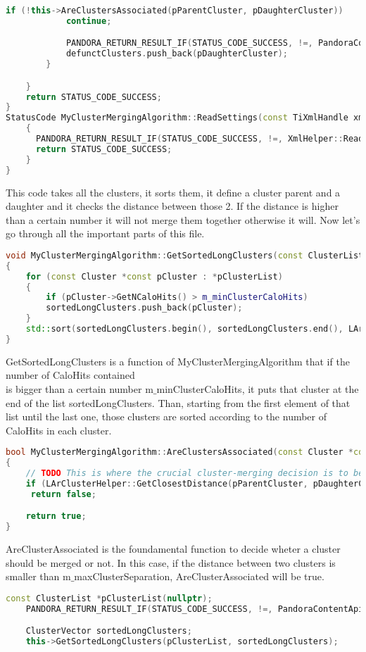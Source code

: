 \begin{lstlisting}[language=C++,caption=MyClusterMergingAlgorithm.cc]
			if (!this->AreClustersAssociated(pParentCluster, pDaughterCluster))
			continue;

			PANDORA_RETURN_RESULT_IF(STATUS_CODE_SUCCESS, !=, PandoraContentApi::MergeAndDeleteClusters(*this, pParentCluster, pDaughterCluster));
			defunctClusters.push_back(pDaughterCluster);
		}

	}
	return STATUS_CODE_SUCCESS;
}
StatusCode MyClusterMergingAlgorithm::ReadSettings(const TiXmlHandle xmlHandle)
	{
	  PANDORA_RETURN_RESULT_IF(STATUS_CODE_SUCCESS, !=, XmlHelper::ReadValue(xmlHandle, "InputClusterListName", m_inputClusterListName));
	  return STATUS_CODE_SUCCESS;
	}
}
\end{lstlisting}
This code takes all the clusters, it sorts them, it define a cluster parent and a daughter and it checks the distance between those 2. If the distance is higher than a certain number it will not merge them together otherwise it will. Now let's go through all the important parts of this file.

\begin{lstlisting}[language=C++]
void MyClusterMergingAlgorithm::GetSortedLongClusters(const ClusterList *const pClusterList, ClusterVector &sortedLongClusters) const
{
	for (const Cluster *const pCluster : *pClusterList)
	{
		if (pCluster->GetNCaloHits() > m_minClusterCaloHits)
		sortedLongClusters.push_back(pCluster);
	}
	std::sort(sortedLongClusters.begin(), sortedLongClusters.end(), LArClusterHelper::SortByNHits);
}
\end{lstlisting}
GetSortedLongClusters is a function of MyClusterMergingAlgorithm that if the number of CaloHits contained\\ is bigger than a certain number m${\_}$minClusterCaloHits, it puts that cluster at the end of the list sortedLongClusters. Than, starting from the first element of that list until the last one, those clusters are sorted according to the number of CaloHits in each cluster.
\begin{lstlisting}[language=C++]
bool MyClusterMergingAlgorithm::AreClustersAssociated(const Cluster *const pParentCluster, const Cluster *const pDaughterCluster) const
{
	// TODO This is where the crucial cluster-merging decision is to be made - add sophistication here!
	if (LArClusterHelper::GetClosestDistance(pParentCluster, pDaughterCluster) > m_maxClusterSeparation)
	 return false;

	return true;
}
\end{lstlisting}
AreClusterAssociated is the foundamental function to decide wheter a cluster should be merged or not. In this case, if the distance between two clusters is smaller than m${\_}$maxClusterSeparation, AreClusterAssociated will be true.
\begin{lstlisting}[language=C++]
	const ClusterList *pClusterList(nullptr);
	PANDORA_RETURN_RESULT_IF(STATUS_CODE_SUCCESS, !=, PandoraContentApi::GetList(*this, m_inputClusterListName, pClusterList));

	ClusterVector sortedLongClusters;
	this->GetSortedLongClusters(pClusterList, sortedLongClusters);

\end{lstlisting}

